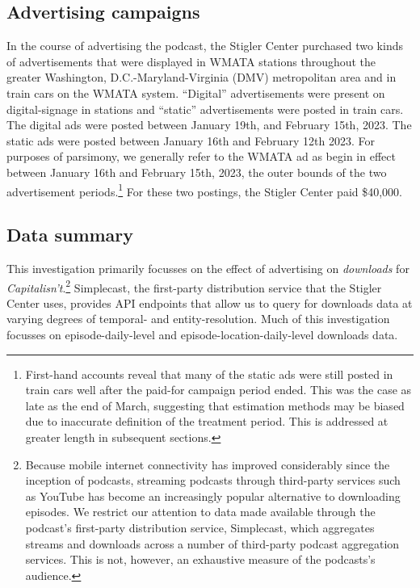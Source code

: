\documentclass[11pt, letterpaper, twoside]{article}
\begin{document}
\subsection{Advertising campaigns}
In the course of advertising the podcast, the Stigler Center purchased two kinds of advertisements that were displayed in WMATA stations throughout the greater Washington, D.C.-Maryland-Virginia (DMV) metropolitan area and in train cars on the WMATA system. ``Digital'' advertisements were present on digital-signage in stations and ``static'' advertisements were posted in train cars. The digital ads were posted between January 19th, and February 15th, 2023. The static ads were posted between January 16th and February 12th 2023. For purposes of parsimony, we generally refer to the WMATA ad as begin in effect between January 16th and February 15th, 2023, the outer bounds of the two advertisement periods.\footnote{First-hand accounts reveal that many of the static ads were still posted in train cars well after the paid-for campaign period ended. This was the case as late as the end of March, suggesting that estimation methods may be biased due to inaccurate definition of the treatment period. This is addressed at greater length in subsequent sections.} For these two postings, the Stigler Center paid \$40,000.

\subsection{Data summary}
This investigation primarily focusses on the effect of advertising on \textit{downloads} for \textit{Capitalisn't}.\footnote{Because mobile internet connectivity has improved considerably since the inception of podcasts, streaming podcasts through third-party services such as YouTube has become an increasingly popular alternative to downloading episodes. We restrict our attention to data made available through the podcast's first-party distribution service, Simplecast, which aggregates streams and downloads across a number of third-party podcast aggregation services. This is not, however, an exhaustive measure of the podcasts's audience.} Simplecast, the first-party distribution service that the Stigler Center uses, provides API endpoints that allow us to query for downloads data at varying degrees of temporal- and entity-resolution. Much of this investigation focusses on episode-daily-level and episode-location-daily-level downloads data.\\
\end{document}
